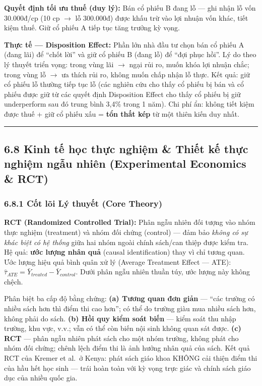 \documentclass[
]{article}
\begin{document}
\textbf{Quyết định tối ưu thuế (duy lý):} Bán cổ phiếu B đang lỗ --- ghi
nhận lỗ vốn 30.000đ/cp (10 cp \(\rightarrow\) lỗ 300.000đ) được khấu trừ
vào lợi nhuận vốn khác, tiết kiệm thuế. Giữ cổ phiếu A tiếp tục tăng
trưởng kỳ vọng.

\textbf{Thực tế --- Disposition Effect:} Phần lớn nhà đầu tư chọn bán cổ
phiếu A (đang lãi) để ``chốt lời'' và giữ cổ phiếu B (đang lỗ) để ``đợi
phục hồi''. Lý do theo lý thuyết triển vọng: trong vùng lãi
\(\rightarrow\) ngại rủi ro, muốn khóa lợi nhuận chắc; trong vùng lỗ
\(\rightarrow\) ưa thích rủi ro, không muốn chấp nhận lỗ thực. Kết quả:
giữ cổ phiếu lỗ thường tiếp tục lỗ (các nghiên cứu cho thấy cổ phiếu bị
bán và cổ phiếu được giữ từ các quyết định Disposition Effect cho thấy
cổ phiếu bị giữ underperform sau đó trung bình 3,4\% trong 1 năm). Chi
phí ẩn: không tiết kiệm được thuế + giữ cổ phiếu xấu = \textbf{tổn thất
kép} từ một thiên kiến duy nhất.

\begin{center}\rule{0.5\linewidth}{0.5pt}\end{center}

\subsection{6.8 Kinh tế học thực nghiệm \& Thiết kế thực nghiệm ngẫu
nhiên (Experimental Economics \&
RCT)}\label{kinh-tux1ebf-hux1ecdc-thux1ef1c-nghiux1ec7m-thiux1ebft-kux1ebf-thux1ef1c-nghiux1ec7m-ngux1eabu-nhiuxean-experimental-economics-rct}

\subsubsection{6.8.1 Cốt lõi Lý thuyết (Core
Theory)}\label{cux1ed1t-luxf5i-luxfd-thuyux1ebft-core-theory-15}

\textbf{RCT (Randomized Controlled Trial):} Phân ngẫu nhiên đối tượng
vào nhóm thực nghiệm (treatment) và nhóm đối chứng (control) --- đảm bảo
\emph{không có sự khác biệt có hệ thống} giữa hai nhóm ngoài chính
sách/can thiệp được kiểm tra. Hệ quả: \textbf{ước lượng nhân quả}
(causal identification) thay vì chỉ tương quan. Ước lượng hiệu quả bình
quân xử lý (Average Treatment Effect --- ATE):
\(\hat{\tau}_{ATE} = \bar{Y}_{treated} - \bar{Y}_{control}\). Dưới phân
ngẫu nhiên thuần túy, ước lượng này không chệch.

Phân biệt ba cấp độ bằng chứng: \textbf{(a) Tương quan đơn giản} ---
``các trường có nhiều sách hơn thì điểm thi cao hơn''; có thể do trường
giàu mua nhiều sách hơn, không phải do sách. \textbf{(b) Hồi quy kiểm
soát biến} --- kiểm soát thu nhập trường, khu vực, v.v.; vẫn có thể còn
biến nội sinh không quan sát được. \textbf{(c) RCT} --- phân ngẫu nhiên
phát sách cho một nhóm trường, không phát cho nhóm đối chứng; chênh lệch
điểm thi là ảnh hưởng nhân quả của sách. Kết quả RCT của Kremer et al.~ở
Kenya: phát sách giáo khoa KHÔNG cải thiện điểm thi của hầu hết học sinh
--- trái hoàn toàn với kỳ vọng trực giác và chính sách giáo dục của
nhiều quốc gia.
\end{document}

